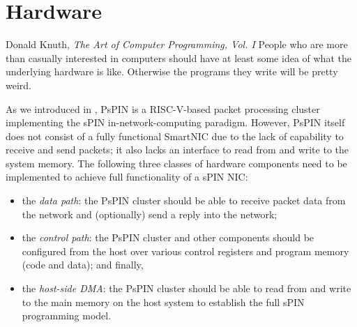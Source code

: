 \chapter{Hardware} \label{chap:hardware}
\begin{chapquote}{Donald Knuth, \textit{The Art of Computer Programming, Vol. I}}
People who are more than casually interested in computers should have at least some idea of what the underlying hardware is like. Otherwise the programs they write will be pretty weird.
\end{chapquote}


As we introduced in , PsPIN is a RISC-V-based packet processing cluster implementing the sPIN in-network-computing paradigm.  However, PsPIN itself does not consist of a fully functional SmartNIC due to the lack of capability to receive and send packets; it also lacks an interface to read from and write to the system memory.  The following three classes of hardware components need to be implemented to achieve full functionality of a sPIN NIC: 

\begin{itemize}
    \item the \emph{data path}: the PsPIN cluster should be able to receive packet data from the network and (optionally) send a reply into the network;
    \item the \emph{control path}: the PsPIN cluster and other components should be configured from the host over various control registers and program memory (code and data); and finally,
    \item the \emph{host-side DMA}: the PsPIN cluster should be able to read from and write to the main memory on the host system to establish the full sPIN programming model.
\end{itemize}

